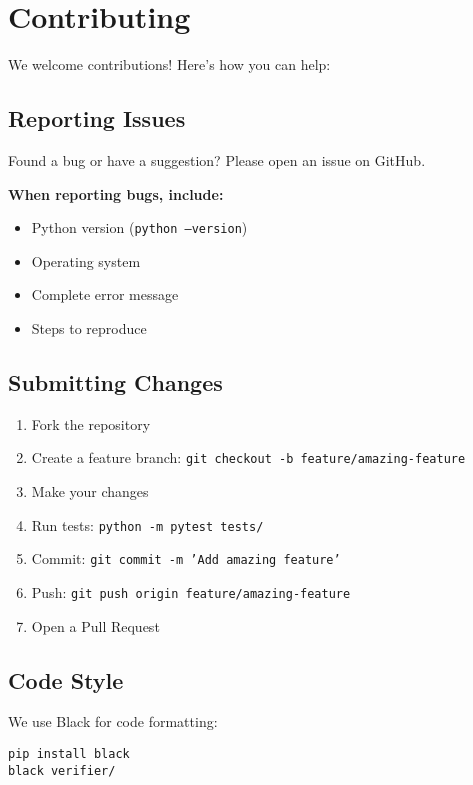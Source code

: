 \documentclass[11pt,a4paper]{article}
\newcommand{\code}[1]{\texttt{#1}}
\begin{document}
\section{Contributing}

We welcome contributions! Here's how you can help:

\subsection{Reporting Issues}

Found a bug or have a suggestion? Please open an issue on GitHub.

\textbf{When reporting bugs, include:}
\begin{itemize}[leftmargin=*,noitemsep]
\item Python version (\code{python --version})
\item Operating system
\item Complete error message
\item Steps to reproduce
\end{itemize}

\subsection{Submitting Changes}

\begin{enumerate}[leftmargin=*]
\item Fork the repository
\item Create a feature branch: \code{git checkout -b feature/amazing-feature}
\item Make your changes
\item Run tests: \code{python -m pytest tests/}
\item Commit: \code{git commit -m 'Add amazing feature'}
\item Push: \code{git push origin feature/amazing-feature}
\item Open a Pull Request
\end{enumerate}

\subsection{Code Style}

We use Black for code formatting:

\begin{lstlisting}[style=bashstyle]
pip install black
black verifier/
\end{lstlisting}
\end{document}
